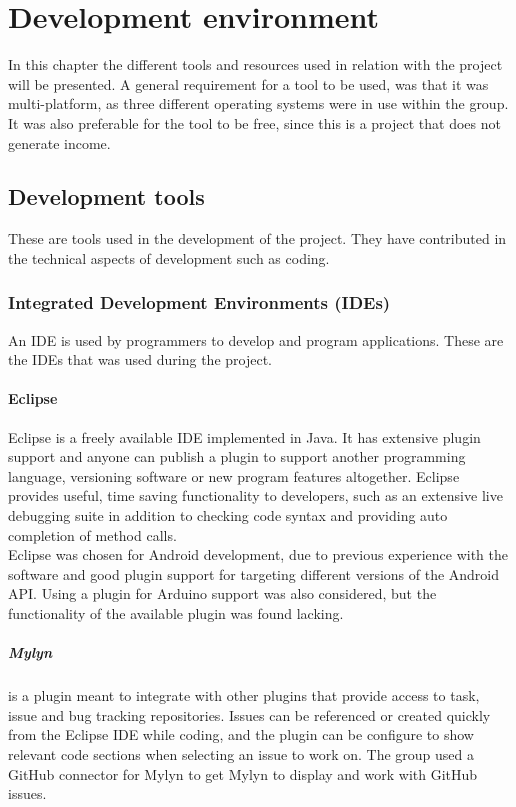 \chapter{Development environment}
In this chapter the different tools and resources used in relation with the project will be presented. A general requirement for a tool to be used, was that it was multi-platform, as three different operating systems were in use within the group. It was also preferable for the tool to be free, since this is a project that does not generate income.

\section{Development tools}
These are tools used in the development of the project. They have contributed in the technical aspects of development such as coding.
\subsection{Integrated Development Environments (IDEs)}
An IDE is used by programmers to develop and program applications. These are the IDEs that was used during the project.

\subsubsection{Eclipse}
Eclipse is a freely available IDE implemented in Java. It has extensive plugin support and anyone can publish a plugin to support another programming language, versioning software or new program features altogether. Eclipse provides useful, time saving functionality to developers, such as an extensive live debugging suite in addition to checking code syntax and providing auto completion of method calls.\\
\newline
Eclipse was chosen for Android development, due to previous experience with the software and good plugin support for targeting different versions of the Android API. Using a plugin for Arduino support was also considered, but the functionality of the available plugin was found lacking. %

\paragraph{Mylyn}
is a plugin meant to integrate with other plugins that provide access to task, issue and bug tracking repositories. Issues can be referenced or created quickly from the Eclipse IDE while coding, and the plugin can be configure to show relevant code sections when selecting an issue to work on. The group used a GitHub connector for Mylyn to get Mylyn to display and work with GitHub issues.

